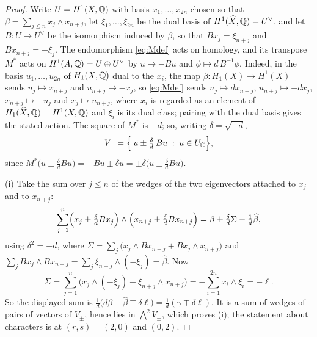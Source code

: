 \begin{proof}
Write $U=H^{1}(X,\mathbb{Q})$ with basis $x_{1},\dots,x_{2n}$ chosen so that
$\beta=\sum_{j\le n}x_{j}\wedge x_{n+j}$, let $\xi_{1},\dots,\xi_{2n}$ be the
dual basis of $H^{1}(\widehat{X},\mathbb{Q})=U^{\vee}$, and let $B\colon U\to U^{\vee}$
be the isomorphism induced by $\beta$, so that $Bx_{j}=\xi_{n+j}$ and
$Bx_{n+j}=-\xi_{j}$. The endomorphism \eqref{eq:Mdef} acts on homology, and
its transpose $M^{*}$ acts on $H^{1}(A,\mathbb{Q})=U\oplus U^{\vee}$ by
$u\mapsto -Bu$ and $\phi\mapsto d\,B^{-1}\phi$. Indeed, in the basis
$u_{1},\dots,u_{2n}$ of $H_{1}(X,\mathbb{Q})$ dual to the $x_{i}$, the map
$\beta\colon H_{1}(X)\to H^{1}(X)$ sends $u_{j}\mapsto x_{n+j}$ and
$u_{n+j}\mapsto-x_{j}$, so \eqref{eq:Mdef} sends $u_{j}\mapsto dx_{n+j}$,
$u_{n+j}\mapsto-dx_{j}$, $x_{n+j}\mapsto-u_{j}$ and $x_{j}\mapsto u_{n+j}$,
where $x_{i}$ is regarded as an element of
$H_{1}(\widehat X,\mathbb{Q})=H^{1}(X,\mathbb{Q})$ and $\xi_{i}$ is its dual class; pairing
with the dual basis gives the stated action. The square of $M^{*}$ is $-d$;
so, writing $\delta=\sqrt{-d}$,
\begin{equation}\label{eq:splitVpm}
  V_{\pm}=\Bigl\{\,u\pm\tfrac{\delta}{d}\,Bu\;:\;u\in U_{\mathbb{C}}\Bigr\},
\end{equation}
since $M^{*}\bigl(u\pm\tfrac{\delta}{d}Bu\bigr)
=-Bu\pm\delta u=\pm\delta\bigl(u\pm\tfrac{\delta}{d}Bu\bigr)$.

(i) Take the sum over $j\le n$ of the wedges of the two eigenvectors attached
to $x_{j}$ and to $x_{n+j}$:
\[
  \sum_{j=1}^{n}
  \Bigl(x_{j}\pm\tfrac{\delta}{d}Bx_{j}\Bigr)\wedge
  \Bigl(x_{n+j}\pm\tfrac{\delta}{d}Bx_{n+j}\Bigr)
  =\beta\pm\tfrac{\delta}{d}\Sigma-\tfrac{1}{d}\widehat{\beta},
\]
using $\delta^{2}=-d$, where
$\Sigma=\sum_{j}\bigl(x_{j}\wedge Bx_{n+j}+Bx_{j}\wedge x_{n+j}\bigr)$ and
$\sum_{j}Bx_{j}\wedge Bx_{n+j}=\sum_{j}\xi_{n+j}\wedge(-\xi_{j})
=\widehat{\beta}$. Now
\[
  \Sigma=\sum_{j=1}^{n}\bigl(x_{j}\wedge(-\xi_{j})
        +\xi_{n+j}\wedge x_{n+j}\bigr)
   =-\sum_{i=1}^{2n}x_{i}\wedge\xi_{i}=-\ell .
\]
So the displayed sum is $\tfrac1d\bigl(d\beta-\widehat{\beta}\mp\delta\ell\bigr)
=\tfrac1d(\gamma\mp\delta\ell)$. It is a sum of wedges of pairs of vectors of
$V_{\pm}$, hence lies in $\bigwedge^{2}V_{\pm}$, which proves (i); the
statement about characters is  at $(r,s)=(2,0)$ and
$(0,2)$.


\end{proof}
